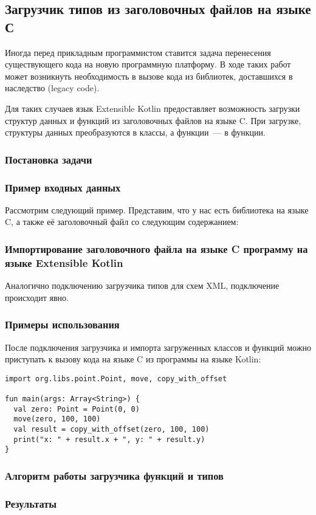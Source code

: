\subsection{Загрузчик типов из заголовочных файлов на языке С}

Иногда перед прикладным программистом ставится задача перенесения существующего кода на новую программную платформу.
В ходе таких работ может возникнуть необходимость в вызове кода из библиотек, доставшихся в наследство (legacy code).

Для таких случаев язык Extensible Kotlin предоставляет возможность загрузки структур данных и функций из заголовочных файлов на языке C.
При загрузке, структуры данных преобразуются в классы, а функции~--- в функции.

\subsubsection{Постановка задачи}
\subsubsection{Пример входных данных}
Рассмотрим следующий пример. Представим, что у нас есть библиотека на языке C, а также её заголовочный файл со следующим содержанием:


\subsubsection{Импортирование заголовочного файла на языке C программу на языке Extensible Kotlin}
Аналогично подключению загрузчика типов для схем XML, подключение происходит явно. \td

\subsubsection{Примеры использования}
После подключения загрузчика и импорта загруженных классов и функций можно приступать к вызову кода на языке C из программы на языке Kotlin:
\begin{lstlisting}
import org.libs.point.Point, move, copy_with_offset

fun main(args: Array<String>) {
  val zero: Point = Point(0, 0)
  move(zero, 100, 100)
  val result = copy_with_offset(zero, 100, 100)
  print("x: " + result.x + ", y: " + result.y)
}
\end{lstlisting}
\subsubsection{Алгоритм работы загрузчика функций и типов}
\subsubsection{Результаты}